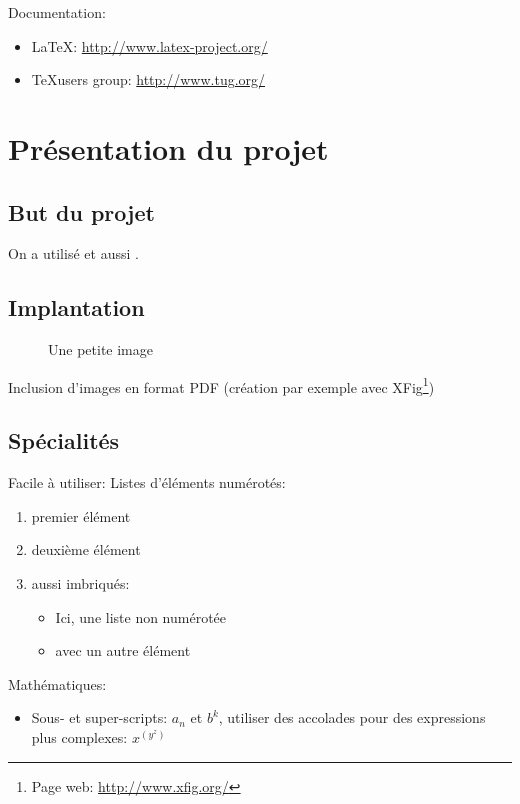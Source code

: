 \documentclass{article}
\begin{document}
{Documentation:
\begin{itemize}
\item \LaTeX: \url{http://www.latex-project.org/}
\item \TeX users group: \url{http://www.tug.org/}
\end{itemize}


\section{Présentation du projet}

\subsection{But du projet}
On a utilisé
\cite{lindholm99_java_virtual_machin_specif,moore89_system_verif} et
aussi \cite{strecker02_verif_java_compil}.

\subsection{Implantation}

\begin{figure}[htbp]
  \centering
  \caption{Une petite image}
  \label{fig:im}
\end{figure}

Inclusion d'images en format PDF (création par exemple avec
XFig\footnote{Page web: \url{http://www.xfig.org/}})

\subsection{Spécialités}

Facile à utiliser: Listes d'éléments numérotés:
\begin{enumerate}
\item premier élément
\item deuxième élément
\item aussi imbriqués:
%
\begin{itemize}
\item Ici, une liste non numérotée
\item avec un autre élément
\end{itemize}
%
\end{enumerate}

Mathématiques:
\begin{itemize}
\item Sous- et super-scripts: $a_n$ et $b^k$, utiliser des accolades
  pour des expressions plus complexes: $x^{(y^z)}$


\end{itemize}}
\end{document}
